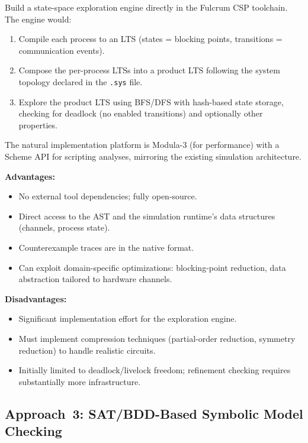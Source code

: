 \documentclass[11pt]{article}
\begin{document}
Build a state-space exploration engine directly in the Fulcrum CSP
toolchain.  The engine would:

\begin{enumerate}
\item Compile each process to an LTS (states = blocking points,
  transitions = communication events).
\item Compose the per-process LTSs into a product LTS following the
  system topology declared in the \texttt{.sys} file.
\item Explore the product LTS using BFS/DFS with hash-based state
  storage, checking for deadlock (no enabled transitions) and
  optionally other properties.
\end{enumerate}

The natural implementation platform is Modula-3 (for performance)
with a Scheme API for scripting analyses, mirroring the existing
simulation architecture.

\textbf{Advantages:}
\begin{itemize}
\item No external tool dependencies; fully open-source.
\item Direct access to the AST and the simulation runtime's data
  structures (channels, process state).
\item Counterexample traces are in the native format.
\item Can exploit domain-specific optimizations: blocking-point
  reduction, data abstraction tailored to hardware channels.
\end{itemize}

\textbf{Disadvantages:}
\begin{itemize}
\item Significant implementation effort for the exploration engine.
\item Must implement compression techniques (partial-order reduction,
  symmetry reduction) to handle realistic circuits.
\item Initially limited to deadlock/livelock freedom; refinement
  checking requires substantially more infrastructure.
\end{itemize}

\subsection{Approach~3: SAT/BDD-Based Symbolic Model Checking}
\end{document}
